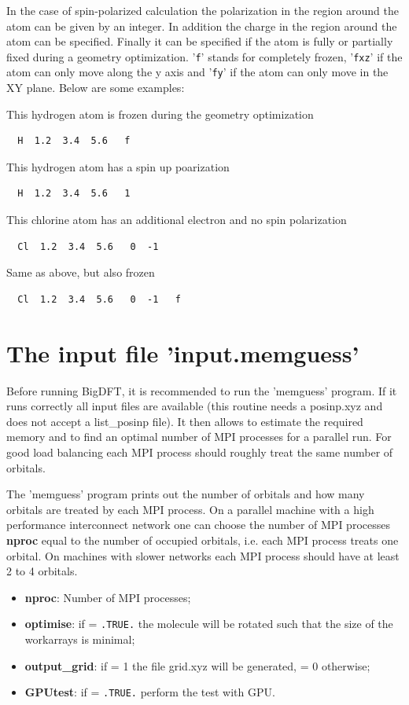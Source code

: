 \documentclass[a4paper,11pt]{report}
\begin{document}
In the case of spin-polarized calculation the polarization in the region around the atom can 
be given by an integer. In addition the charge in the region around the atom can be specified.
Finally it can be specified if the atom is fully or partially fixed during a geometry optimization.
'\texttt{f}' stands for completely frozen, '\texttt{fxz}' if the atom can only move along the y axis and '\texttt{fy}' if the atom 
can only move in the XY plane. Below are some examples:

This hydrogen atom is frozen during the geometry optimization
\begin{verbatim}
  H  1.2  3.4  5.6   f
\end{verbatim}

This hydrogen atom has a spin up poarization
\begin{verbatim}
  H  1.2  3.4  5.6   1
\end{verbatim}

This chlorine atom has an additional electron and no spin polarization
\begin{verbatim}
  Cl  1.2  3.4  5.6   0  -1
\end{verbatim}

Same as above, but also frozen
\begin{verbatim}
  Cl  1.2  3.4  5.6   0  -1   f
\end{verbatim}

\section{The input file 'input.memguess'}
Before running BigDFT, it is recommended to run the 'memguess' program. If it runs correctly all input files are available 
(this routine needs a posinp.xyz and does not accept a list\_posinp file). It then allows to estimate the required memory and to 
find an optimal number of MPI processes for a parallel run. For good load balancing each MPI process should roughly treat the same number of orbitals.

The 'memguess' program prints out the number of orbitals and how many orbitals are treated by each MPI process. 
On a parallel machine with a high performance interconnect network one can choose the number of MPI processes {\bf nproc} equal 
to the number of occupied orbitals, i.e. each MPI process treats one orbital. On machines with slower networks each MPI process should 
have at least 2 to 4 orbitals. 
\begin{itemize}
\item {\bf nproc}: Number of MPI processes;
\item {\bf optimise}: if = \texttt{.TRUE.} the molecule will be rotated such that the size of the workarrays is minimal;
\item {\bf output\_grid}: if = 1 the file grid.xyz will be generated, = 0 otherwise;
\item {\bf GPUtest}: if = \texttt{.TRUE.} perform the test with GPU.
\end{itemize}
\end{document}
